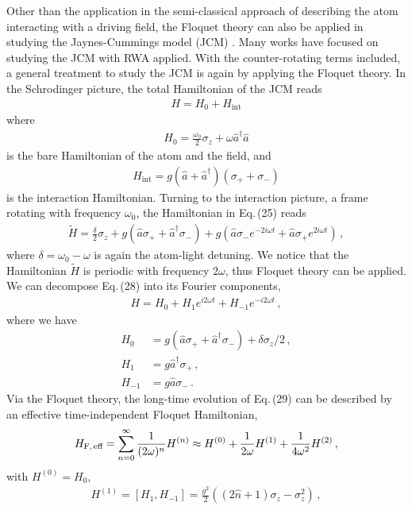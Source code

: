 \documentclass[reprint, amsmath, amssymb, aps]{revtex4-2}
\newcommand{\that}[1]{\widetilde{#1}}
\begin{document}
Other than the application in the semi-classical approach of describing the atom interacting with a driving field, the Floquet theory can also be applied in studying the Jaynes-Cummings model (JCM) \cite{Engelhardt, Wang, Ermann}. Many works have focused on studying the JCM with RWA applied. With the counter-rotating terms included, a general treatment to study the JCM is again by applying the Floquet theory. In the Schrodinger picture, the total Hamiltonian of the JCM reads
\begin{align}
H = H_0 + H_{\text{int}}
\end{align}
where 
\begin{align}
H_0 = \frac{\omega_0}{2}\sigma_z + \omega\hat{a}^\dagger \hat{a}
\end{align}
is the bare Hamiltonian of the atom and the field, and 
\begin{align}
H_{\text{int}} = g(\hat{a}+ \hat{a}^\dagger) (\sigma_+ + \sigma_-)
\end{align}
is the interaction Hamiltonian. Turning to the interaction picture, a frame rotating with frequency $\omega_0$, the Hamiltonian in Eq.\,(25) reads
\begin{align}
\that{H} = \frac{\delta}{2}\sigma_z + g(\hat{a}\sigma_+ + \hat{a}^\dagger \sigma_-) + g(\hat{a}\sigma_- e^{-2i\omega t} + \hat{a}\sigma_+ e^{2i\omega t})\,,
\end{align}
where $\delta = \omega_0 - \omega$ is again the atom-light detuning. We notice that the Hamiltonian $\that{H}$ is periodic with frequency $2\omega$, thus Floquet theory can be applied. We can decompose Eq.\,(28) into its Fourier components,
\begin{align}
H = H_0 + H_1 e^{i2\omega t} + H_{-1}e^{-i2\omega t}\,,
\end{align}
where we have
\begin{align}
H_0 &= g(\hat{a}\sigma_+ + \hat{a}^\dagger \sigma_- ) + \delta {\sigma_z}/{2}\,,\\
H_1 &= g \hat{a}^\dagger \sigma_+\,,\\
H_{-1} &= g\hat{a}\sigma_-\,.
\end{align}
Via the Floquet theory, the long-time evolution of Eq.\,(29) can be described by an effective time-independent Floquet Hamiltonian, 
\begin{align}
H_{\text{F,\,eff}} = \sum_{n=0}^\infty \frac{1}{(2\omega)^n}H^{(n)} \approx H^{(0)} + \frac{1}{2\omega}H^{(1)} + \frac{1}{4\omega^2} H^{(2)}\,,
\end{align}
with $H^{(0)} = H_0$, 
\begin{align}
H^{(1)} =[H_1,H_{-1}] = \frac{g^2}{2}\left( (2\hat{n} + 1) \sigma_z - \sigma_z^2\right)\,,
\end{align}
\end{document}
